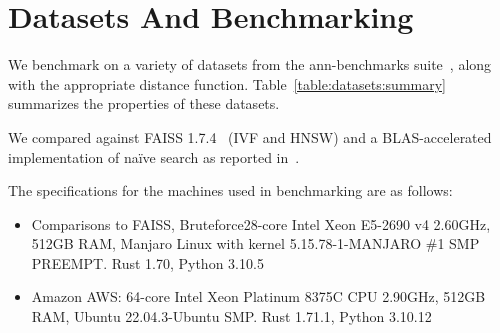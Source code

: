 
\section{Datasets And Benchmarking}
\label{sec:datasets-and-distance-functions}


We benchmark on a variety of datasets from the ann-benchmarks suite~\cite{Aumller2018ANNBenchmarksAB}, 
along with the appropriate distance function.
Table~\ref{table:datasets:summary} summarizes the properties of these datasets.

We compared against FAISS 1.7.4~\cite{johnson2019billion} (IVF and HNSW) and a BLAS-accelerated implementation of na\"ive search as reported in~\cite{johnson2019billion}.

The specifications for the machines used in benchmarking are as follows:

\begin{itemize}
\item Comparisons to FAISS, Bruteforce28-core Intel Xeon E5-2690 v4 2.60GHz, 512GB RAM, Manjaro Linux with kernel 5.15.78-1-MANJARO \#1 SMP PREEMPT. Rust 1.70, Python 3.10.5
\item Amazon AWS: 64-core Intel Xeon Platinum 8375C CPU 2.90GHz, 512GB RAM, Ubuntu 22.04.3-Ubuntu SMP. Rust 1.71.1, Python 3.10.12
\end{itemize}




